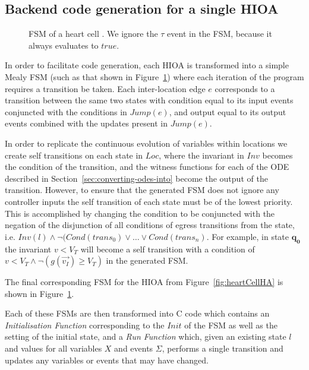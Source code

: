 \subsection{Backend code generation for a single \ac{HIOA}}
\label{sec:backendCodeGeneration}

\begin{figure}
  \centering
  
  \caption{\acf{FSM} of a heart cell \label{fig:heartCellFSM}. We ignore
    the $\tau$ event in the \ac{FSM}, because it always evaluates to $true$.}
\end{figure}

In order to facilitate code generation, each \ac{HIOA} is transformed into a 
simple Mealy \ac{FSM} (such as that shown in Figure~\ref{fig:heartCellFSM}) 
where each iteration of the program requires a transition be taken.  Each 
inter-location edge $e$ corresponds to a transition between the same two states 
with condition equal to its input events conjuncted with the conditions in 
$Jump(e)$, and output equal to its output events combined with the updates 
present in $Jump(e)$.

In order to replicate the continuous evolution of variables within locations we 
create self transitions on each state in $Loc$, where the invariant in $Inv$ 
becomes the condition of the transition, and the witness functions for each of 
the \acs{ODE} described in Section~\ref{sec:converting-odes-into} become the 
output of the transition. However, to ensure that the generated \ac{FSM} does 
not ignore any controller inputs the self transition of each state must be of 
the lowest priority.  This is accomplished by changing the condition to be 
conjuncted with the negation of the disjunction of all conditions of egress 
transitions from the state, i.e. $Inv(l) \wedge \neg (Cond(trans_{0}) \vee 
\dots \vee Cond(trans_{n})$.  For example, in state $\mathbf{q_0}$ the 
invariant $v < V_{T}$ will become a self transition with a condition of $v < 
V_{T} \wedge \neg (g(\vec{v_{I}}) \geq V_{T})$ in the generated \ac{FSM}.

The final corresponding \ac{FSM} for the \ac{HIOA} from 
Figure~\ref{fig:heartCellHA} is shown in Figure~\ref{fig:heartCellFSM}.

Each of these \acp{FSM} are then transformed into C code which contains an 
\emph{Initialisation Function} corresponding to the $Init$ of the \ac{FSM} as 
well as the setting of the initial state, and a \emph{Run Function} which, 
given an existing state $l$ and values for all variables $X$ and events 
$\Sigma$, performs a single transition and updates any variables or events that 
may have changed.
